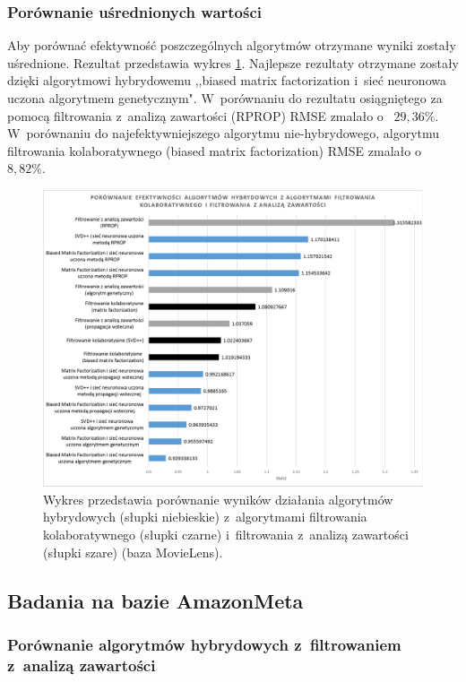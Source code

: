 \documentclass[twoside]{iisthesis}
\begin{document}
		\subsubsection{Porównanie uśrednionych wartości}
		
		Aby porównać efektywność poszczególnych algorytmów otrzymane wyniki zostały uśrednione. Rezultat przedstawia wykres \ref{fig:ml_exphybrid}. Najlepsze rezultaty otrzymane zostały dzięki algorytmowi hybrydowemu ,,biased matrix factorization i~sieć neuronowa uczona algorytmem genetycznym". W~porównaniu do rezultatu osiągniętego za pomocą filtrowania z~analizą zawartości (RPROP) RMSE zmalało o~ $29,36\%$. W~porównaniu do najefektywniejszego algorytmu nie-hybrydowego, algorytmu filtrowania kolaboratywnego (biased matrix factorization) RMSE zmalało o~$8,82\%$.
		
		\begin{figure}
			\centering
			\includegraphics[width=1\textwidth]{ml_exphybrid}	
			\caption{Wykres przedstawia porównanie wyników działania algorytmów hybrydowych (słupki niebieskie) z~algorytmami filtrowania kolaboratywnego (słupki czarne) i~filtrowania z~analizą zawartości (słupki szare) (baza MovieLens).}
			\label{fig:ml_exphybrid}
		\end{figure}
		
		\pagebreak
		\subsection{Badania na bazie AmazonMeta}
				
		\subsubsection{Porównanie algorytmów hybrydowych z~filtrowaniem z~analizą zawartości}
		
\end{document}
